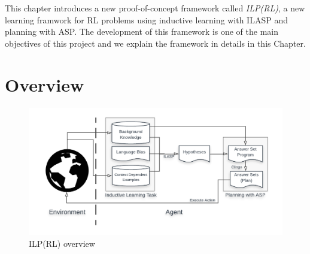 This chapter introduces a new proof-of-concept framework called \textit{ILP(RL)}, a new learning framwork for RL problems using inductive learning with ILASP and planning with ASP.
The development of this framework is one of the main objectives of this project and we explain the framework in details in this Chapter.

\section{Overview}
\label{sec:overview}

\begin{figure}[!htb]
\centering
\includegraphics[width=1.0\textwidth]{./figures/architecture}
\caption{ILP(RL) overview}
\label{fig:ILPRL_overview}
\end{figure}

